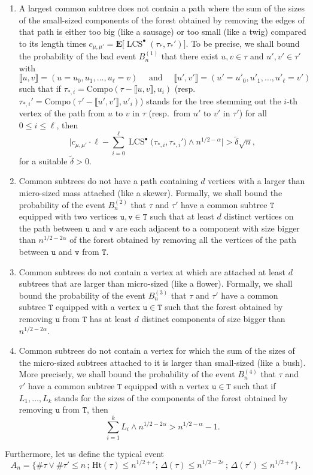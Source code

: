 \documentclass[11pt,reqno]{amsart}
\newcommand{\1}{\mathbf{1}}
\newcommand{\0}{\mathbf{0}}
\newcommand{\ttT}{\mathtt{T}}
\newcommand{\ttu}{\mathtt{u}}
\newcommand{\ttv}{\mathtt{v}}
\newcommand{\E}{{\mathbf E}}
\newcommand{\Ht}{\mathrm{Ht}}
\newcommand{\LCS}{\operatorname{LCS}}
\begin{document}
\begin{enumerate}
    \item[\textbf{Sausage/Twig.}] A largest common subtree does not contain a path where the sum of the sizes of the small-sized components of the forest obtained by removing the edges of that path is either too big (like a sausage) or too small (like a twig) compared to its length times $c_{\mu,\mu'}=\E\big[\LCS^\bullet(\tau_*,\tau_*')\big]$. To be precise, we shall bound the probability of the bad event $B_n^{(1)}$ that there exist $u,v\in \tau$ and $u',v'\in\tau'$ with \[\llbracket u,v\rrbracket=(u=u_0,u_1,\dots, u_\ell=v)\quad\text{ and }\quad\llbracket u',v'\rrbracket=(u'=u'_0,u'_1,\dots, u'_\ell=v')\]
    such that if $\tau_{*,i}=\mathrm{Compo}(\tau-\llbracket u,v \rrbracket, u_i)$ (resp.~$\tau_{*,i}'=\mathrm{Compo}(\tau'-\llbracket u',v' \rrbracket, u'_i)$)  stands for the tree stemming out the $i$-th vertex of the path from $u$ to $v$ in $\tau$ (resp.~from $u'$ to $v'$ in $\tau'$) for all $0\leq i\leq \ell$, then
    \[\bigg|c_{\mu,\mu'}\cdot\ell-\sum_{i=0}^{\ell} \LCS^\bullet\big(\tau_{*,i},\tau_{*,i}')\wedge n^{1/2-\alpha}\bigg|> \tilde{\delta} \sqrt{n},\]
    for a suitable $\tilde{\delta}>0$.
    \item[\textbf{Skewer.}]  Common subtrees do not have a path containing $d$ vertices with a larger than micro-sized mass attached (like a skewer). Formally, we shall bound the probability of the event $B_n^{(2)}$ that $\tau$ and $\tau'$ have a common subtree $\ttT$ equipped with two vertices $\ttu,\ttv\in\ttT$ such that at least $d$ distinct vertices on the path between $\ttu$ and $\ttv$ are each adjacent to a component with size bigger than $n^{1/2-2\alpha}$ of the forest obtained by removing all the vertices of the path between $\ttu$ and $\ttv$ from $\ttT$. 
    \item[\textbf{Flower.}] Common subtrees do not contain a vertex at which are attached at least $d$ subtrees that are larger than micro-sized (like a flower). Formally, we shall bound the probability of the event $B_n^{(3)}$ that $\tau$ and $\tau'$ have a common subtree $\ttT$ equipped with a vertex $\ttu\in\ttT$ such that the forest obtained by removing $\ttu$ from $\ttT$ has at least $d$ distinct components of size bigger than $n^{1/2-2\alpha}$.
    \item[\textbf{Bush.}]  Common subtrees do not contain a vertex for which the sum of the sizes of the micro-sized subtrees attached to it is larger than small-sized (like a bush). More precisely, we shall bound the probability of the event $B_n^{(4)}$ that $\tau$ and $\tau'$ have a common subtree $\ttT$ equipped with a vertex $\ttu\in\ttT$ such that if $L_1,\ldots,L_k$ stands for the sizes of the components of the forest obtained by removing $\ttu$ from $\ttT$, then
    \[\sum_{i=1}^k L_i\wedge n^{1/2-2\alpha}> n^{1/2-\alpha}-1.\]
\end{enumerate}
Furthermore, let us define the typical event \[A_n=\big\{\#\tau\vee\#\tau'\leq n\, ;\, \Ht(\tau)\leq n^{1/2+\varepsilon}  ;\, \Delta(\tau)\leq n^{1/2-2\varepsilon}\, ;\, \Delta(\tau')\leq n^{1/2+\varepsilon}\big\}.\]
\end{document}
